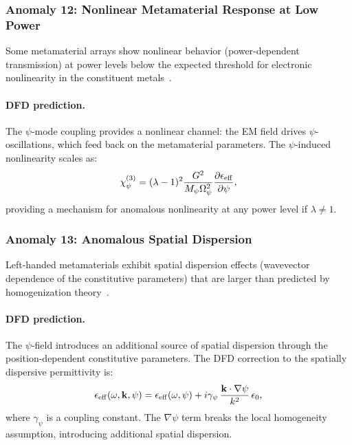 \documentclass[aps,prb,twocolumn,superscriptaddress,floatfix,nofootinbib,longbibliography]{revtex4-2}
\newcommand{\Opsi}{\Omega_\psi}
\newcommand{\Mpsi}{M_\psi}
\begin{document}
\subsubsection{Anomaly 12: Nonlinear Metamaterial Response at Low Power}

Some metamaterial arrays show nonlinear behavior (power-dependent
transmission) at power levels below the expected threshold for electronic
nonlinearity in the constituent metals~\cite{Shadrivov2006,Rose2011}.

\paragraph{DFD prediction.}
The $\psi$-mode coupling provides a nonlinear channel: the EM field
drives $\psi$-oscillations, which feed back on the metamaterial
parameters.  The $\psi$-induced nonlinearity scales as:
\begin{equation}
\chi^{(3)}_\psi = (\lambda - 1)^2\frac{G^2}{\Mpsi\Opsi^2}
\frac{\partial\epsilon_{\rm eff}}{\partial\psi},
\label{eq:chi3-psi}
\end{equation}
providing a mechanism for anomalous nonlinearity at any power level
if $\lambda \neq 1$.

\subsubsection{Anomaly 13: Anomalous Spatial Dispersion}

Left-handed metamaterials exhibit spatial dispersion effects (wavevector
dependence of the constitutive parameters) that are larger than predicted
by homogenization theory~\cite{Simovski2009,Albooyeh2011}.

\paragraph{DFD prediction.}
The $\psi$-field introduces an additional source of spatial dispersion
through the position-dependent constitutive parameters.  The DFD
correction to the spatially dispersive permittivity is:
\begin{equation}
\epsilon_{\rm eff}(\omega,\mathbf{k},\psi) = \epsilon_{\rm eff}(\omega,\psi)
+ i\gamma_\psi\,\frac{\mathbf{k}\cdot\nabla\psi}{k^2}\,\epsilon_0,
\label{eq:spatial-disp}
\end{equation}
where $\gamma_\psi$ is a coupling constant.  The $\nabla\psi$ term
breaks the local homogeneity assumption, introducing additional spatial
dispersion.
\end{document}
